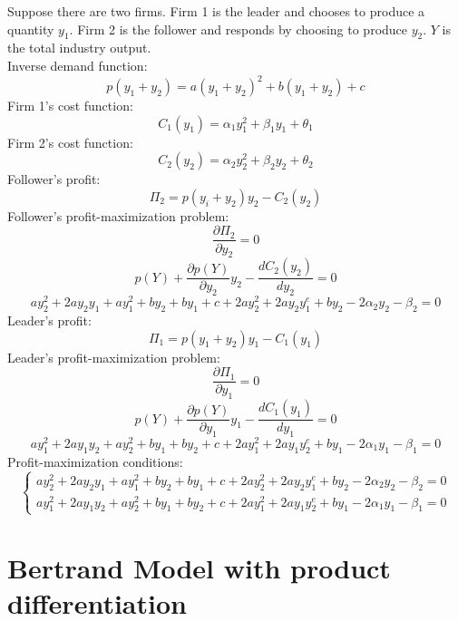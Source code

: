 \documentclass[11pt, a4paper]{article}
\begin{document}
Suppose there are two firms. Firm 1 is the leader and chooses to produce a quantity $y_{1}$. Firm 2 is the follower and responds by choosing to produce $y_{2}$. $Y$ is the total industry output.\\
Inverse demand function:
\begin{equation*}
	p(y_{1} + y_{2}) = a(y_{1} + y_{2})^2 + b(y_{1} + y_{2})  + c
\end{equation*}
Firm 1's cost function:
\begin{equation*} 
	C_{1}(y_{1}) = \alpha _{1}y_{1}^2 + \beta _{1}y_{1} + \theta _{1}
\end{equation*}
Firm 2's cost function:
\begin{equation*}
	C_{2}(y_{2}) = \alpha _{2}y_{2}^2 + \beta _{2}y_{2} + \theta _{2}
\end{equation*}
Follower's profit:
\begin{equation*}
	\Pi _{2} = p(y_{i} + y_{2})y_{2} - C_{2}(y_{2})
\end{equation*}
Follower's profit-maximization problem:
\begin{equation*}
	\frac{\partial\Pi_{2}}{\partial y_{2}} = 0
\end{equation*}
\begin{equation*}
	p(Y) + \frac{\partial p(Y)}{\partial y_{2}}y_{2} - \frac{dC_{2}(y_{2})}{dy_{2}} = 0
\end{equation*}
\begin{equation*} 
	ay_{2}^2 + 2ay_{2}y_{1} + ay_{1}^2 + by_{2} + by_{1} + c + 2ay_{2}^2 + 2ay_{2}y_{1}^e + by_{2} - 2\alpha _{2}y_{2} - \beta _{2} = 0
\end{equation*}
Leader's profit:
\begin{equation*}
	\Pi _{1} = p(y_{1} + y_{2})y_{1} - C_{1}(y_{1})
\end{equation*}
Leader's profit-maximization problem:
\begin{equation*}
	\frac{\partial\Pi_{1}}{\partial y_{1}} = 0
\end{equation*}
\begin{equation*}
	p(Y) + \frac{\partial p(Y)}{\partial y_{1}}y_{1} - \frac{dC_{1}(y_{1})}{dy_{1}} = 0
\end{equation*}
\begin{equation*} 
	ay_{1}^2 + 2ay_{1}y_{2} + ay_{2}^2 + by_{1} + by_{2} + c + 2ay_{1}^2 + 2ay_{1}y_{2}^e + by_{1} - 2\alpha _{1}y_{1} - \beta _{1} = 0
\end{equation*}
Profit-maximization conditions:
\begin{equation*}
	\begin{cases}
		ay_{2}^2 + 2ay_{2}y_{1} + ay_{1}^2 + by_{2} + by_{1} + c + 2ay_{2}^2 + 2ay_{2}y_{1}^e + by_{2} - 2\alpha _{2}y_{2} - \beta _{2} = 0 \\
		ay_{1}^2 + 2ay_{1}y_{2} + ay_{2}^2 + by_{1} + by_{2} + c + 2ay_{1}^2 + 2ay_{1}y_{2}^e + by_{1} - 2\alpha _{1}y_{1} - \beta _{1} = 0
	\end{cases}
\end{equation*}

\section{Bertrand Model with product differentiation}
\end{document}
